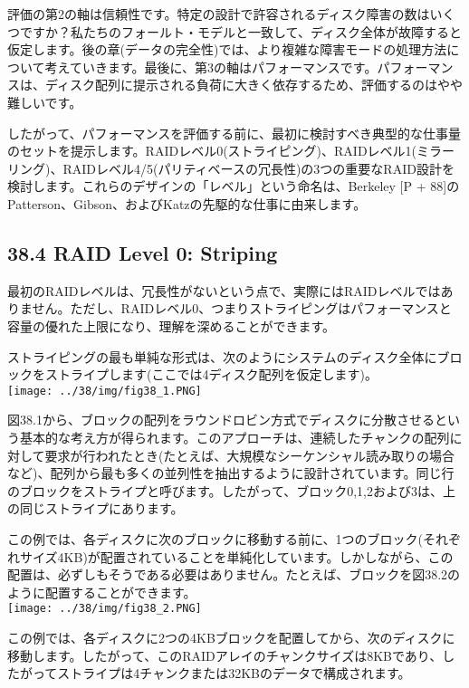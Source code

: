 評価の第2の軸は信頼性です。特定の設計で許容されるディスク障害の数はいくつですか？私たちのフォールト・モデルと一致して、ディスク全体が故障すると仮定します。後の章(データの完全性)では、より複雑な障害モードの処理方法について考えていきます。最後に、第3の軸はパフォーマンスです。パフォーマンスは、ディスク配列に提示される負荷に大きく依存するため、評価するのはやや難しいです。

したがって、パフォーマンスを評価する前に、最初に検討すべき典型的な仕事量のセットを提示します。RAIDレベル0(ストライピング)、RAIDレベル1(ミラーリング)、RAIDレベル4/5(パリティベースの冗長性)の3つの重要なRAID設計を検討します。これらのデザインの「レベル」という命名は、Berkeley
{[}P + 88{]}のPatterson、Gibson、およびKatzの先駆的な仕事に由来します。

\hypertarget{raid-level-0-striping}{%
\subsection*{38.4 RAID Level 0: Striping}\label{raid-level-0-striping}}

最初のRAIDレベルは、冗長性がないという点で、実際にはRAIDレベルではありません。ただし、RAIDレベル0、つまりストライピングはパフォーマンスと容量の優れた上限になり、理解を深めることができます。

ストライピングの最も単純な形式は、次のようにシステムのディスク全体にブロックをストライプします(ここでは4ディスク配列を仮定します)。\\
\texttt{[image: ../38/img/fig38\_1.PNG]}

図38.1から、ブロックの配列をラウンドロビン方式でディスクに分散させるという基本的な考え方が得られます。このアプローチは、連続したチャンクの配列に対して要求が行われたとき(たとえば、大規模なシーケンシャル読み取りの場合など)、配列から最も多くの並列性を抽出するように設計されています。同じ行のブロックをストライプと呼びます。したがって、ブロック0,1,2および3は、上の同じストライプにあります。

この例では、各ディスクに次のブロックに移動する前に、1つのブロック(それぞれサイズ4KB)が配置されていることを単純化しています。しかしながら、この配置は、必ずしもそうである必要はありません。たとえば、ブロックを図38.2のように配置することができます。\\
\texttt{[image: ../38/img/fig38\_2.PNG]}

この例では、各ディスクに2つの4KBブロックを配置してから、次のディスクに移動します。したがって、このRAIDアレイのチャンクサイズは8KBであり、したがってストライプは4チャンクまたは32KBのデータで構成されます。

